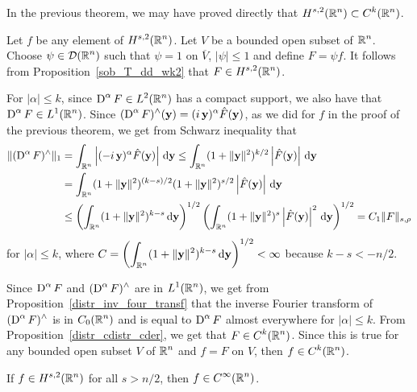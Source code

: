 \begin{rmk}
In the previous theorem, we may have proved directly that 
$\displaystyle H^{s,2}(\mathbb{R}^n) \subset C^k(\mathbb{R}^n)$.

Let $f$ be any element of $\displaystyle H^{s,2}(\mathbb{R}^n)$.  Let $V$ be
a bounded open subset of $\displaystyle \mathbb{R}^n$.  Choose
$\displaystyle \psi \in \mathcal{D}(\mathbb{R}^n)$ such that
$\psi = 1$ on $\overline{V}$,  $|\psi|\leq 1$ and define $F = \psi f$.
It follows from Proposition~\ref{sob_T_dd_wk2} that
$\displaystyle F \in H^{s,2}(\mathbb{R}^n)$.

For $|\alpha|\leq k$, since $\displaystyle \operatorname{D}^\alpha F \in L^2(\mathbb{R}^n)$
has a compact support, we also have that
$\displaystyle \operatorname{D}^\alpha F \in L^1(\mathbb{R}^n)$.
Since $\displaystyle (\operatorname{D}^\alpha F)^\wedge(\mathbf{y}) =
(i\,\mathbf{y})^\alpha \hat{F}(\mathbf{y})$, as we did for $f$ in the proof
of the previous theorem, we get from Schwarz inequality that
\begin{align*}
\| (\operatorname{D}^\alpha F)^\wedge \|_1 &= 
\int_{\mathbb{R}^n} \left| (-i\,\mathbf{y})^\alpha \hat{F}(\mathbf{y}) \right| \,\mathrm{d}{\mathbf{y}}
\leq \int_{\mathbb{R}^n} (1+\|\mathbf{y}\|^2)^{k/2} \left| \hat{F}(\mathbf{y}) \right|
\,\mathrm{d}{\mathbf{y}} \\
& = \int_{\mathbb{R}^n} (1+\|\mathbf{y}\|^2)^{(k-s)/2}
 (1+\|\mathbf{y}\|^2)^{s/2} \left| \hat{F}(\mathbf{y}) \right| \,\mathrm{d}{\mathbf{y}} \\
&\leq \left( \int_{\mathbb{R}^n} (1+\|\mathbf{y}\|^2)^{k-s} \,\mathrm{d}{\mathbf{y}} \right)^{1/2}
 \left(\int_{\mathbb{R}^n} (1+\|\mathbf{y}\|^2)^s \left|\hat{F}(\mathbf{y}) \right|^2
\,\mathrm{d}{\mathbf{y}}\right)^{1/2}
= C_1 \| F \|_{s,\rho}
\end{align*}
for $|\alpha|\leq k$, where
$\displaystyle
C = \left( \int_{\mathbb{R}^n} (1+\|\mathbf{y}\|^2)^{k-s} \,\mathrm{d}{\mathbf{y}} \right)^{1/2}
< \infty$ because $k-s < -n/2$.

Since
$\displaystyle \operatorname{D}^\alpha F$ and $\displaystyle (\operatorname{D}^\alpha F)^\wedge$
are in $\displaystyle L^1(\mathbb{R}^n)$, we
get from Proposition~\ref{distr_inv_four_transf} that the inverse Fourier
transform of $\displaystyle (\operatorname{D}^\alpha F)^\wedge$ is in
$\displaystyle C_0(\mathbb{R}^n)$
and is equal to $\displaystyle \operatorname{D}^\alpha F$ almost everywhere
for $|\alpha| \leq k$.  From Proposition~\ref{distr_cdistr_cder}, we
get that $\displaystyle F\in C^k(\mathbb{R}^n)$.  Since this is true for any
bounded open subset $V$ of $\displaystyle \mathbb{R}^n$ and $f=F$ on $V$, then
$\displaystyle f\in C^k(\mathbb{R}^n)$.
\end{rmk}

\begin{cor}
If $\displaystyle f\in H^{s,2}(\mathbb{R}^n)$ for all $s>n/2$, then
$\displaystyle f\in C^\infty(\mathbb{R}^n)$.
\end{cor}

